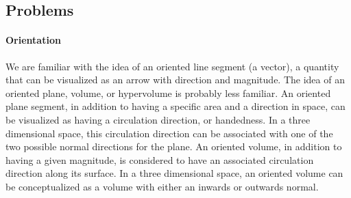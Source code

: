
\subsection{Problems}




\paragraph{Orientation}
We are familiar with the idea of an oriented line segment (a vector), a quantity that can be visualized as an arrow with direction and magnitude.
The idea of an oriented plane, volume, or hypervolume is probably less familiar.
An oriented plane segment, in addition to having a specific area and a direction in space, can be visualized as having a
circulation direction, or handedness.
In a three dimensional space, this circulation direction can be associated with one of the two possible normal directions for the plane.
An oriented volume, in addition to having a given magnitude, is considered to have an associated circulation direction along its surface.
In a three dimensional space, an oriented volume can be conceptualized as a volume with either an inwards or outwards normal.


